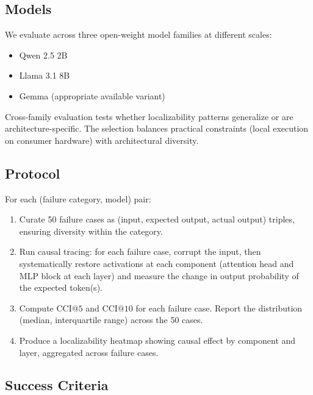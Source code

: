 \documentclass[11pt]{article}
\begin{document}
\subsection{Models}

We evaluate across three open-weight model families at different scales:

\begin{itemize}[leftmargin=*]
  \item Qwen 2.5 2B
  \item Llama 3.1 8B
  \item Gemma (appropriate available variant)
\end{itemize}

Cross-family evaluation tests whether localizability patterns generalize or are architecture-specific. The selection balances practical constraints (local execution on consumer hardware) with architectural diversity.

\subsection{Protocol}

For each (failure category, model) pair:

\begin{enumerate}[leftmargin=*]
  \item Curate 50 failure cases as (input, expected output, actual output) triples, ensuring diversity within the category.
  \item Run causal tracing: for each failure case, corrupt the input, then systematically restore activations at each component (attention head and MLP block at each layer) and measure the change in output probability of the expected token(s).
  \item Compute $\text{CCI}@5$ and $\text{CCI}@10$ for each failure case. Report the distribution (median, interquartile range) across the 50 cases.
  \item Produce a localizability heatmap showing causal effect by component and layer, aggregated across failure cases.
\end{enumerate}

\subsection{Success Criteria}
\end{document}
